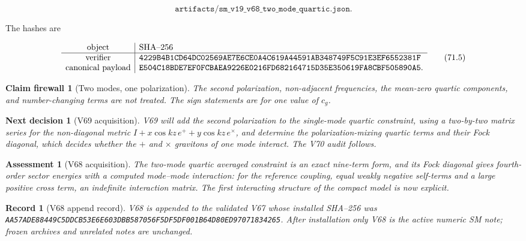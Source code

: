 \documentclass[11pt]{article}
\newtheorem{firewall}[theorem]{Claim firewall}
\newtheorem{decision}[theorem]{Next decision}
\newtheorem{assessment}[theorem]{Assessment}
\newtheorem{record}[theorem]{Record}
\theoremstyle{remark}
\begin{document}
\[
 \texttt{artifacts/sm\_v19\_v68\_two\_mode\_quartic.json}.           \tag{71.4}
\]

The hashes are

\[
\begin{array}{c|l}
\hbox{object}&\hbox{SHA--256}\\ \hline
\hbox{verifier}&
\texttt{4229B4B1CD64DC02569AE7E6CE0A4C619A44591AB348749F5C91E3EF6552381F}\\
\hbox{canonical payload}&
\texttt{E504C18BDE7EF0FCBAEA9226E0216FD682164715D35E350619FA8CBF505890A5}.
\end{array}                                                     \tag{71.5}
\]

\begin{firewall}[Two modes, one polarization]
\label{fire:v19v68}
The second polarization, non-adjacent frequencies, the mean-zero
quartic components, and number-changing terms are not treated.  The
sign statements are for one value of \(c_g\).
\end{firewall}

\begin{decision}[V69 acquisition]
\label{dec:v19v68-next}
V69 will add the second polarization to the single-mode quartic
constraint, using a two-by-two matrix series for the non-diagonal
metric \(I+x\cos kz\,e^++y\cos kz\,e^\times\), and determine the
polarization-mixing quartic terms and their Fock diagonal, which
decides whether the \(+\) and \(\times\) gravitons of one mode interact.
The V70 audit follows.
\end{decision}

\begin{assessment}[V68 acquisition]
\label{ass:v19v68}
The two-mode quartic averaged constraint is an exact nine-term form,
and its Fock diagonal gives fourth-order sector energies with a
computed mode--mode interaction: for the reference coupling, equal
weakly negative self-terms and a large positive cross term, an
indefinite interaction matrix.  The first interacting structure of the
compact model is now explicit.
\end{assessment}

\begin{record}[V68 append record]
\label{rec:v19v68}
V68 is appended to the validated V67 whose installed SHA--256 was
\texttt{AA57ADE88449C5DDCB53E6E603DBB587056F5DF5DF001B64D80ED97071834265}.
After installation only V68 is the active numeric SM note; frozen
archives and unrelated notes are unchanged.
\end{record}
\end{document}
